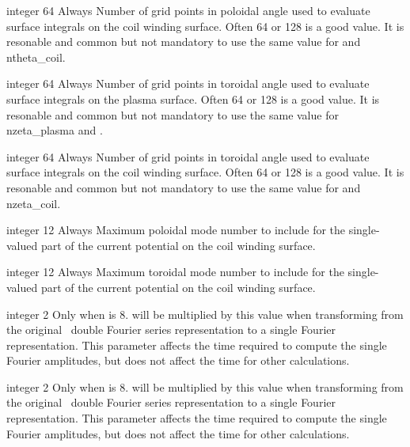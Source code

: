 \myhrule

{integer}
{64}
{Always}
{Number of grid points in poloidal angle used to evaluate surface integrals on the coil winding surface.
Often 64 or 128 is a good value.
It is resonable and common but not mandatory to use the same value for  and {\ttfamily ntheta\_coil}.}

\myhrule


{integer}
{64}
{Always}
{Number of grid points in toroidal angle used to evaluate surface integrals on the plasma surface.
Often 64 or 128 is a good value.
It is resonable and common but not mandatory to use the same value for {\ttfamily nzeta\_plasma} and .}

\myhrule

{integer}
{64}
{Always}
{Number of grid points in toroidal angle used to evaluate surface integrals on the coil winding surface.
Often 64 or 128 is a good value.
It is resonable and common but not mandatory to use the same value for  and {\ttfamily nzeta\_coil}.}

\myhrule

{integer}
{12}
{Always}
{Maximum poloidal mode number to include for the single-valued part of the current potential on the coil winding surface.
}

\myhrule

{integer}
{12}
{Always}
{
Maximum toroidal mode number to include for the single-valued part of the current potential on the coil winding surface.
}

\myhrule

{integer}
{2}
{Only when  is 8.}
{ will be multiplied by this value
when transforming from the original \vmec~double Fourier series representation to a single Fourier representation.
This parameter affects the time required to compute the single Fourier amplitudes,
but does not affect the time for other calculations.
}

\myhrule

{integer}
{2}
{Only when  is 8.}
{ will be multiplied by this value
when transforming from the original \vmec~double Fourier series representation to a single Fourier representation.
This parameter affects the time required to compute the single Fourier amplitudes,
but does not affect the time for other calculations.
}

